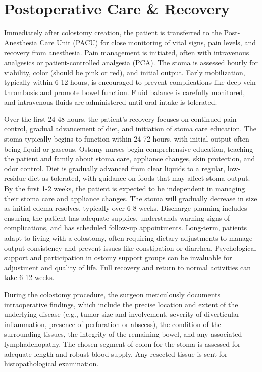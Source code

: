 \section*{Postoperative Care \& Recovery}
Immediately after colostomy creation, the patient is transferred to the Post-Anesthesia Care Unit (PACU) for close monitoring of vital signs, pain levels, and recovery from anesthesia. Pain management is initiated, often with intravenous analgesics or patient-controlled analgesia (PCA). The stoma is assessed hourly for viability, color (should be pink or red), and initial output. Early mobilization, typically within 6-12 hours, is encouraged to prevent complications like deep vein thrombosis and promote bowel function. Fluid balance is carefully monitored, and intravenous fluids are administered until oral intake is tolerated.

Over the first 24-48 hours, the patient's recovery focuses on continued pain control, gradual advancement of diet, and initiation of stoma care education. The stoma typically begins to function within 24-72 hours, with initial output often being liquid or gaseous. Ostomy nurses begin comprehensive education, teaching the patient and family about stoma care, appliance changes, skin protection, and odor control. Diet is gradually advanced from clear liquids to a regular, low-residue diet as tolerated, with guidance on foods that may affect stoma output. By the first 1-2 weeks, the patient is expected to be independent in managing their stoma care and appliance changes. The stoma will gradually decrease in size as initial edema resolves, typically over 6-8 weeks. Discharge planning includes ensuring the patient has adequate supplies, understands warning signs of complications, and has scheduled follow-up appointments. Long-term, patients adapt to living with a colostomy, often requiring dietary adjustments to manage output consistency and prevent issues like constipation or diarrhea. Psychological support and participation in ostomy support groups can be invaluable for adjustment and quality of life. Full recovery and return to normal activities can take 6-12 weeks.

During the colostomy procedure, the surgeon meticulously documents intraoperative findings, which include the precise location and extent of the underlying disease (e.g., tumor size and involvement, severity of diverticular inflammation, presence of perforation or abscess), the condition of the surrounding tissues, the integrity of the remaining bowel, and any associated lymphadenopathy. The chosen segment of colon for the stoma is assessed for adequate length and robust blood supply. Any resected tissue is sent for histopathological examination.

